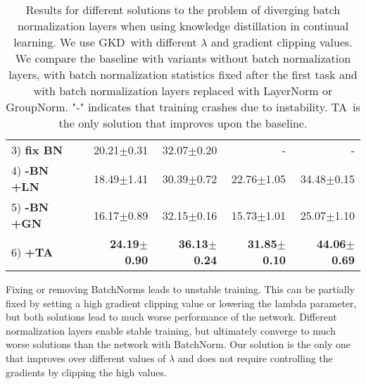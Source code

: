 \documentclass[10pt,twocolumn,letterpaper]{article}
\newcommand\rev[1]{{#1}}
\newcommand\gkd{GKD}
\newcommand\ta{TA}
\begin{document}
\begin{table}[!h]
{\begin{tabular}{@{}lrrrr@{}}
3) \textbf{fix BN}  & 20.21$\pm$0.31                    & 32.07$\pm$0.20                  & -                                 & -                               \\
4) \textbf{-BN +LN} & 18.49$\pm$1.41                    & 30.39$\pm$0.72                  & 22.76$\pm$1.05                    & 34.48$\pm$0.15                  \\
5) \textbf{-BN +GN} & 16.17$\pm$0.89 & 32.15$\pm$0.16 & 15.73$\pm$1.01 & 25.07$\pm$1.10  \\  
6) \textbf{+\ta\ }    & \textbf{24.19$\pm$0.90}           & \textbf{36.13$\pm$0.24}         & \textbf{31.85$\pm$0.10}           & \textbf{44.06$\pm$0.69}         \\ \bottomrule
\end{tabular}%
}
\caption{Results for different solutions to the problem of diverging batch normalization layers when using knowledge distillation in continual learning. We use \gkd\  with different $\lambda$ and gradient clipping values. We compare the baseline with variants without batch normalization layers, with batch normalization statistics fixed after the first task and with batch normalization layers replaced with LayerNorm \rev{or GroupNorm}. "-" indicates that training crashes due to instability. \ta\ is the only solution that improves upon the baseline.}
\label{tab:bn_ablations}
\end{table}


Fixing or removing BatchNorms leads to unstable training. This can be partially fixed by setting a high gradient clipping value or lowering the lambda parameter, but both solutions lead to much worse performance of the network. %
\rev{Different normalization layers enable stable training, but ultimately converge to much worse solutions than the network with BatchNorm.}
Our solution is the only one that improves over different values of $\lambda$ and does not require controlling the gradients by clipping the high values.
\end{document}
